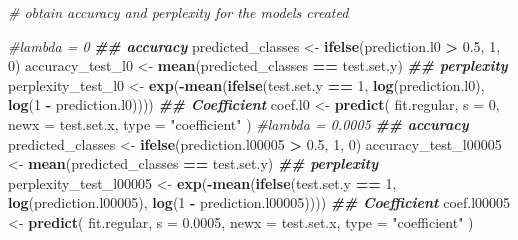 \documentclass[
]{article}
\newenvironment{Shaded}{\begin{snugshade}}{\end{snugshade}}
\newcommand{\AttributeTok}[1]{\textcolor[rgb]{0.13,0.29,0.53}{#1}}
\newcommand{\CommentTok}[1]{\textcolor[rgb]{0.56,0.35,0.01}{\textit{#1}}}
\newcommand{\DecValTok}[1]{\textcolor[rgb]{0.00,0.00,0.81}{#1}}
\newcommand{\DocumentationTok}[1]{\textcolor[rgb]{0.56,0.35,0.01}{\textbf{\textit{#1}}}}
\newcommand{\FloatTok}[1]{\textcolor[rgb]{0.00,0.00,0.81}{#1}}
\newcommand{\FunctionTok}[1]{\textcolor[rgb]{0.13,0.29,0.53}{\textbf{#1}}}
\newcommand{\NormalTok}[1]{#1}
\newcommand{\OtherTok}[1]{\textcolor[rgb]{0.56,0.35,0.01}{#1}}
\newcommand{\SpecialCharTok}[1]{\textcolor[rgb]{0.81,0.36,0.00}{\textbf{#1}}}
\newcommand{\StringTok}[1]{\textcolor[rgb]{0.31,0.60,0.02}{#1}}
\begin{document}
\begin{Shaded}
\begin{Highlighting}[]
\CommentTok{\# obtain accuracy and perplexity for the models created}

\CommentTok{\#lambda = 0}
\DocumentationTok{\#\# accuracy}
\NormalTok{predicted\_classes }\OtherTok{\textless{}{-}} \FunctionTok{ifelse}\NormalTok{(prediction.l0 }\SpecialCharTok{\textgreater{}} \FloatTok{0.5}\NormalTok{, }\DecValTok{1}\NormalTok{, }\DecValTok{0}\NormalTok{)}
\NormalTok{accuracy\_test\_l0 }\OtherTok{\textless{}{-}} \FunctionTok{mean}\NormalTok{(predicted\_classes }\SpecialCharTok{==}\NormalTok{ test.set.y)}
\DocumentationTok{\#\# perplexity }
\NormalTok{perplexity\_test\_l0 }\OtherTok{\textless{}{-}} 
  \FunctionTok{exp}\NormalTok{(}\SpecialCharTok{{-}}\FunctionTok{mean}\NormalTok{(}\FunctionTok{ifelse}\NormalTok{(test.set.y }\SpecialCharTok{==} \DecValTok{1}\NormalTok{, }\FunctionTok{log}\NormalTok{(prediction.l0), }\FunctionTok{log}\NormalTok{(}\DecValTok{1} \SpecialCharTok{{-}}\NormalTok{ prediction.l0))))}
\DocumentationTok{\#\# Coefficient}
\NormalTok{coef.l0 }\OtherTok{\textless{}{-}}  
  \FunctionTok{predict}\NormalTok{(}
\NormalTok{    fit.regular, }
    \AttributeTok{s =} \DecValTok{0}\NormalTok{, }
    \AttributeTok{newx =}\NormalTok{ test.set.x,}
    \AttributeTok{type =} \StringTok{"coefficient"}
\NormalTok{    )}
\CommentTok{\#lambda = 0.0005}
\DocumentationTok{\#\# accuracy}
\NormalTok{predicted\_classes }\OtherTok{\textless{}{-}} \FunctionTok{ifelse}\NormalTok{(prediction.l00005 }\SpecialCharTok{\textgreater{}} \FloatTok{0.5}\NormalTok{, }\DecValTok{1}\NormalTok{, }\DecValTok{0}\NormalTok{)}
\NormalTok{accuracy\_test\_l00005 }\OtherTok{\textless{}{-}} \FunctionTok{mean}\NormalTok{(predicted\_classes }\SpecialCharTok{==}\NormalTok{ test.set.y)}
\DocumentationTok{\#\# perplexity }
\NormalTok{perplexity\_test\_l00005 }\OtherTok{\textless{}{-}} 
  \FunctionTok{exp}\NormalTok{(}\SpecialCharTok{{-}}\FunctionTok{mean}\NormalTok{(}\FunctionTok{ifelse}\NormalTok{(test.set.y }\SpecialCharTok{==} \DecValTok{1}\NormalTok{, }\FunctionTok{log}\NormalTok{(prediction.l00005), }\FunctionTok{log}\NormalTok{(}\DecValTok{1} \SpecialCharTok{{-}}\NormalTok{ prediction.l00005))))}
\DocumentationTok{\#\# Coefficient}
\NormalTok{coef.l00005 }\OtherTok{\textless{}{-}}  
  \FunctionTok{predict}\NormalTok{(}
\NormalTok{    fit.regular, }
    \AttributeTok{s =} \FloatTok{0.0005}\NormalTok{, }
    \AttributeTok{newx =}\NormalTok{ test.set.x,}
    \AttributeTok{type =} \StringTok{"coefficient"}
\NormalTok{    )}


\end{Highlighting}
\end{Shaded}
\end{document}
